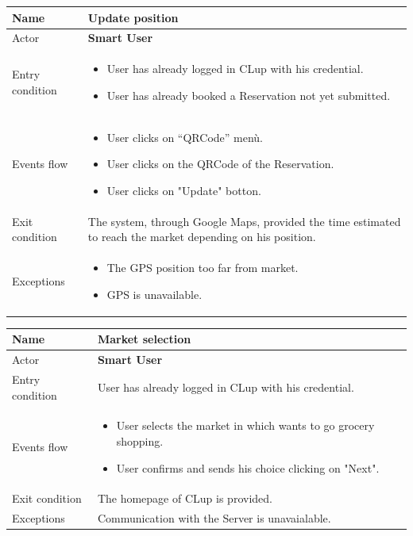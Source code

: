 \par \medskip

\begin{tabular}{|p{5cm} | p{7cm} | }
	\hline
	Name & \textbf{Update position}  \\
	\hline
	Actor & \textbf{Smart User} \\
	\hline
	Entry condition &
	\begin{itemize}
	    \item User has already logged in CLup with his credential. 
		\item User has already booked a Reservation not yet submitted.
        \end{itemize} \\
	\hline
	Events flow & 
	\begin{itemize}
		\item User clicks on “QRCode” menù.
        \item User clicks on the QRCode of the Reservation.
        \item User clicks on "Update" botton.
	\end{itemize} \\
	\hline
	Exit condition &
	The system, through Google Maps, provided the time estimated to reach the market depending on his position. \\
	\hline 
	Exceptions & 
	\begin{itemize}
		\item The GPS position too far from market.
		\item GPS is unavailable.
	\end{itemize} \\
	\hline
\end{tabular}

\par \medskip

\begin{tabular}{|p{5cm} | p{7cm} | }
	\hline
	Name & \textbf{Market selection}  \\
	\hline
	Actor & \textbf{Smart User} \\
	\hline
	Entry condition & User has already logged in CLup with his credential. \\
	\hline
	Events flow & 
	\begin{itemize}
		\item User selects the market in which wants to go grocery shopping.
		\item User confirms and sends his choice clicking on "Next". 
	\end{itemize} \\
	\hline
	Exit condition &
	The homepage of CLup is provided.  \\
	\hline 
	Exceptions & Communication with the Server is unavaialable.\\
	\hline
\end{tabular}

